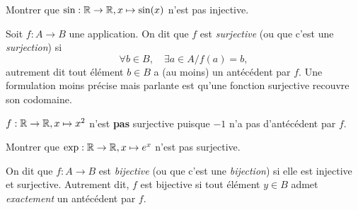 \begin{exercice}
Montrer que  $\sin : \mathbb{R}\to \mathbb{R}, x\mapsto \sin(x)$ n'est pas injective.
\end{exercice}


\begin{definition}
Soit $f : A \to B$ une application. On dit que $f$ est \emph{surjective} (ou que c'est une \emph{surjection}) si
\[\forall b \in B,\quad \exists a\in A / f(a)=b,\]
autrement dit tout élément $b\in B$ a (au moins) un antécédent par $f$.
Une formulation moins précise mais parlante est  qu'une fonction surjective \og recouvre son codomaine\fg{}.
\end{definition}

\begin{exemple}
$f : \mathbb{R}\to \mathbb{R}, x\mapsto x^2$ n'est \textbf{pas} surjective puisque $-1$ n'a pas d'antécédent par $f$.
\end{exemple}

\begin{exercice}
Montrer que  $\exp: \mathbb{R}\to \mathbb{R}, x\mapsto e^x$ n'est pas surjective.
\end{exercice}

\begin{definition}
On dit que $f : A\to B$ est \emph{bijective} (ou que c'est une \emph{bijection}) si elle est injective et surjective. Autrement dit, $f$ est bijective si tout élément $y\in B$ admet \emph{exactement} un antécédent par $f$.
\end{definition}

